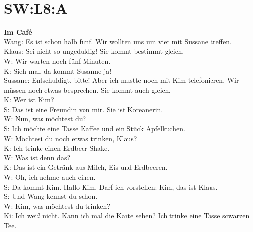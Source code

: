 \section{SW:L8:A}
\textbf{Im Café} \\
Wang: Es ist schon halb fünf. Wir wollten uns um vier mit Sussane treffen. \\
Klaus: Sei nicht so ungeduldig! Sie kommt bestimmt gleich.  \\
W: Wir warten noch fünf Minuten. \\
K: Sieh mal, da kommt Susanne ja!  \\
Sussane: Entschuldigt, bitte! Aber ich mustte noch mit Kim telefonieren. Wir müssen noch etwas besprechen. Sie kommt auch gleich.  \\
K: Wer ist Kim? \\
S: Das ist eine Freundin von mir. Sie ist Koreanerin. \\
W: Nun, was möchtest du?  \\
S: Ich möchte eine Tasse Kaffee und ein Stück Apfelkuchen. \\
W: Möchtest du noch etwas trinken, Klaus? \\
K: Ich trinke einen Erdbeer-Shake.  \\
W: Was ist denn das? \\
K: Das ist ein Getränk aus Milch, Eis und Erdbeeren.  \\
W: Oh, ich nehme auch einen. \\
S: Da kommt Kim. Hallo Kim. Darf ich vorstellen: Kim, das ist Klaus.  \\
S: Und Wang kennst du schon. \\
W: Kim, was möchtest du trinken? \\
Ki: Ich weiß nicht. Kann ich mal die Karte sehen? Ich trinke eine Tasse scwarzen Tee. \\
